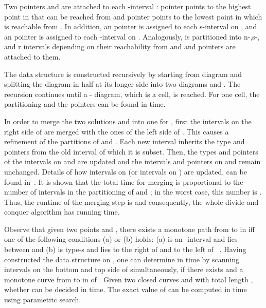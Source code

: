 \documentclass[12pt]{dalthesis}
\begin{document}
Two pointers  and  are attached
to each -interval :
pointer  points to the highest point in  that can be reached    
from  and pointer  points to
 the lowest point in   which is reachable from . In addition, 
an  pointer is assigned to each s-interval on , and
an  pointer is assigned to each  -interval on . Analogously, 
 is partitioned into n-,s-, and r intervals depending on their reachability from 
 and  and  pointers are attached to them. 

The data structure is constructed 
recursively by starting from diagram 
and splitting the diagram in half at its longer side into two diagrams 
 and . The recursion continues until 
 a - diagram, which is a cell, is reached.
For one cell, the partitioning and the pointers  can be found in  time. 

In order to merge the two solutions  and  
into one for , first the intervals on the
right side  of  are merged with the ones of the left side  of .
This causes a refinement of the partitions of  and . Each new 
interval inherits the type and pointers from the old interval of which it is 
subset. Then, the types and  pointers of the intervals on  and  are updated and the intervals and pointers on  and  remain unchanged.
Details of how intervals on  (or intervals on ) 
are updated, can be found in~\cite{AltG95}. 
It is shown that the total time for merging is proportional to 
the number of intervals in the partitioning of  and ; 
in the worst case, this number is 
 . Thus, the runtime of the merging step is 
and consequently, the whole divide-and-conquer algorithm has  running time.

Observe that given two points  and ,
there exists a monotone path from  to  in  	iff one of the 
following conditions (a) or (b) holds: 
(a)  is an -interval and  lies between  and  
(b) is type-s and  lies to the right of  and to the left of ~\cite{AltG95}.
Having constructed the data structure on , 
one can determine in  time by scanning intervals on the bottom and top 
side of  simultaneously, if there exists   and a monotone curve from
 to  in  of .
Given two closed curves  and  with total length , 
whether 
can be decided in  time. 
The exact value of 
 can be computed in  time using parametric search.
\end{document}
